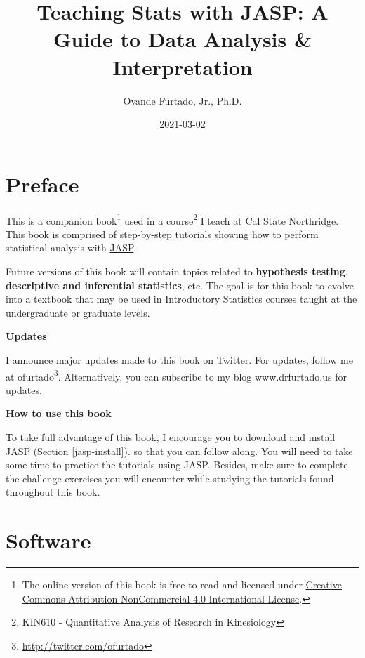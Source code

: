 \documentclass[
]{book}
\title{Teaching Stats with JASP: A Guide to Data Analysis \& Interpretation}
\author{Ovande Furtado, Jr., Ph.D.}
\date{2021-03-02}
\begin{document}
\maketitle

{
\setcounter{tocdepth}{1}
\tableofcontents
}
\hypertarget{preface}{%
\chapter*{Preface}\label{preface}}

This is a companion book\footnote{The online version of this book is free to read and licensed under \href{http://creativecommons.org/licenses/by-nc/4.0/}{Creative Commons Attribution-NonCommercial 4.0 International License}.} used in a course\footnote{KIN610 - Quantitative Analysis of Research in Kinesiology} I teach at \href{https://academics.csun.edu/faculty/ovande.furtado}{Cal State Northridge}. This book is comprised of step-by-step tutorials showing how to perform statistical analysis with \protect\hyperlink{jasp}{JASP}.

Future versions of this book will contain topics related to \textbf{hypothesis testing}, \textbf{descriptive and inferential statistics}, etc. The goal is for this book to evolve into a textbook that may be used in Introductory Statistics courses taught at the undergraduate or graduate levels.

\textbf{Updates}

I announce major updates made to this book on Twitter. For updates, follow me at ofurtado\footnote{\url{http://twitter.com/ofurtado}}. Alternatively, you can subscribe to my blog \href{http://drfurtado.us}{www.drfurtado.us} for updates.

\textbf{How to use this book}

To take full advantage of this book, I encourage you to download and install JASP (Section \ref{jasp-install}). so that you can follow along. You will need to take some time to practice the tutorials using JASP. Besides, make sure to complete the challenge exercises you will encounter while studying the tutorials found throughout this book.

\hypertarget{appendix-appendix}{%
\appendix}


\hypertarget{software}{%
\chapter{Software}\label{software}}
\end{document}
